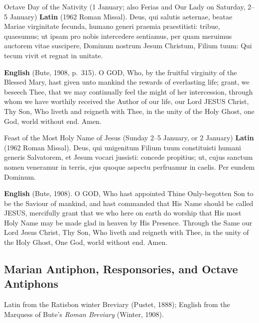 \begin{massbox}{Octave Day of the Nativity (1 January; also Ferias and Our Lady on Saturday, 2--5 January)}
\textbf{Latin} (1962 Roman Missal). Deus, qui salutis aeternae, beatae Mariae
virginitate fecunda, humano generi praemia praestitisti: tribue, quaesumus; ut
ipsam pro nobis intercedere sentiamus, per quam meruimus auctorem vitae
suscipere, Dominum nostrum Jesum Christum, Filium tuum: Qui tecum vivit et
regnat in unitate.

\textbf{English} (Bute, 1908, p.~315). O GOD, Who, by the fruitful virginity of
the Blessed Mary, hast given unto mankind the rewards of everlasting life;
grant, we beseech Thee, that we may continually feel the might of her
intercession, through whom we have worthily received the Author of our life,
our Lord JESUS Christ, Thy Son, Who liveth and reigneth with Thee, in the unity
of the Holy Ghost, one God, world without end. Amen.
\end{massbox}

\begin{massbox}{Feast of the Most Holy Name of Jesus (Sunday 2--5 January, or 2 January)}
\textbf{Latin} (1962 Roman Missal). Deus, qui unigenitum Filium tuum
constituisti humani generis Salvatorem, et Jesum vocari jussisti: concede
propitius; ut, cujus sanctum nomen veneramur in terris, ejus quoque aspectu
perfruamur in caelis. Per eundem Dominum.

\textbf{English} (Bute, 1908). O GOD, Who hast appointed Thine Only-begotten
Son to be the Saviour of mankind, and hast commanded that His Name should be
called JESUS, mercifully grant that we who here on earth do worship that His
most Holy Name may be made glad in heaven by His Presence. Through the Same our
Lord Jesus Christ, Thy Son, Who liveth and reigneth with Thee, in the unity of
the Holy Ghost, One God, world without end. Amen.
\end{massbox}

\subsection{Marian Antiphon, Responsories, and Octave Antiphons}

Latin from the Ratisbon winter Breviary (Pustet, 1888); English from the
Marquess of Bute's \textit{Roman Breviary} (Winter, 1908).


